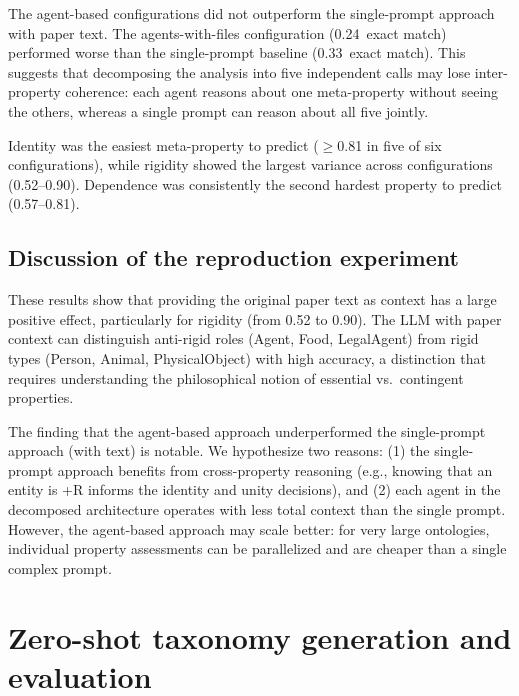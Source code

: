 \documentclass{IOS-Book-Article}
\begin{document}
The agent-based configurations did not outperform the single-prompt
approach with paper text.  The agents-with-files configuration
(0.24~exact match) performed worse than the single-prompt baseline
(0.33~exact match).  This suggests that decomposing the analysis into
five independent calls may lose inter-property coherence: each agent
reasons about one meta-property without seeing the others, whereas a
single prompt can reason about all five jointly.

Identity was the easiest meta-property to predict ($\geq$0.81 in five
of six configurations), while rigidity showed the largest variance
across configurations (0.52--0.90).  Dependence was consistently the
second hardest property to predict (0.57--0.81).

\subsection{Discussion of the reproduction experiment}

These results show that providing the original paper text as context
has a large positive effect, particularly for rigidity (from 0.52 to
0.90).  The LLM with paper context can distinguish anti-rigid roles
(Agent, Food, LegalAgent) from rigid types (Person, Animal,
PhysicalObject) with high accuracy, a distinction that requires
understanding the philosophical notion of essential vs.\ contingent
properties.

The finding that the agent-based approach underperformed the
single-prompt approach (with text) is notable.  We hypothesize two
reasons: (1) the single-prompt approach benefits from cross-property
reasoning (e.g., knowing that an entity is +R informs the identity
and unity decisions), and (2) each agent in the decomposed
architecture operates with less total context than the single prompt.
However, the agent-based approach may scale better: for very large
ontologies, individual property assessments can be parallelized and
are cheaper than a single complex prompt.

\section{Zero-shot taxonomy generation and evaluation}
\label{sec:zeroshot}
\end{document}
